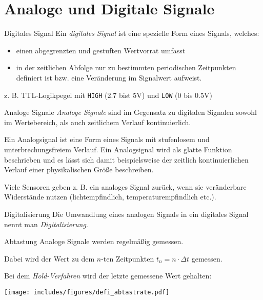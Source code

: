 \section{Analoge und Digitale Signale}

\begin{defi}{Digitales Signal}
    Ein \emph{digitales Signal} ist eine spezielle Form eines Signals, welches:
    \begin{itemize}
        \item einen abgegrenzten und gestuften Wertvorrat umfasst
        \item in der zeitlichen Abfolge nur zu bestimmten periodischen Zeitpunkten definiert ist bzw. eine Veränderung im Signalwert aufweist.
    \end{itemize}

    z. B. TTL-Logikpegel mit \texttt{HIGH} (2.7 bist 5V) und \texttt{LOW} (0 bis 0.5V)
\end{defi}

\begin{defi}{Analoge Signale}
    \emph{Analoge Signale} sind im Gegensatz zu digitalen Signalen sowohl im Wertebereich, als auch zeitlichem Verlauf kontinuierlich.

    Ein Analogsignal ist eine Form eines Signals mit stufenlosem und unterbrechungsfreiem Verlauf.
    Ein Analogsignal wird als glatte Funktion beschrieben und es lässt sich damit beispielsweise der zeitlich kontinuierlichen Verlauf einer physikalischen Größe beschreiben.

    Viele Sensoren geben z. B. ein analoges Signal zurück, wenn sie veränderbare Widerstände nutzen (lichtempfindlich, temperaturempfindlich etc.).
\end{defi}

\begin{defi}{Digitalisierung}
    Die Umwandlung eines analogen Signals in ein digitales Signal nennt man \emph{Digitalisierung}.
\end{defi}

\begin{bonus}{Abtastung}
    Analoge Signale werden regelmäßig gemessen.

    Dabei wird der Wert zu dem $n$-ten Zeitpunkten $t_n = n \cdot \Delta t$ gemessen.

    Bei dem \emph{Hold-Verfahren} wird der letzte gemessene Wert gehalten:

    \begin{center}
        \texttt{[image: includes/figures/defi\_abtastrate.pdf]}
    \end{center}
\end{bonus}

